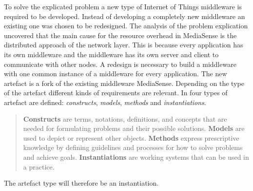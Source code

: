 To solve the explicated problem a new type of Internet of Things middleware is required to be developed. Instead of developing a completely new middleware an existing one was chosen to be redesigned. The analysis of the problem explication uncovered that the main cause for the resource overhead in MediaSense is the distributed approach of the network layer. This is because every application has its own middleware and the middleware has its own server and client to communicate with other nodes. A redesign is necessary to build a middleware with one common instance of a middleware for every application. The new artefact is a fork of the existing middleware MediaSense. Depending on the type of the artefact different kinds of requirements are relevant. In \cite{johannesson2012design} four types of artefact are defined: \emph{constructs}, \emph{models}, \emph{methods} and \emph{instantiations}.  

\begin{quotation}
  \textbf{Constructs} are terms, notations, definitions, and concepts that are needed for formulating problems and their possible solutions.
  \textbf{Models} are used to depict or represent other objects.
  \textbf{Methods} express prescriptive knowledge by defining guidelines and processes for how to solve problems and achieve goals.
  \textbf{Instantiations} are working systems that can be used in a practice.
\end{quotation}
The artefact type will therefore be an instantiation.
